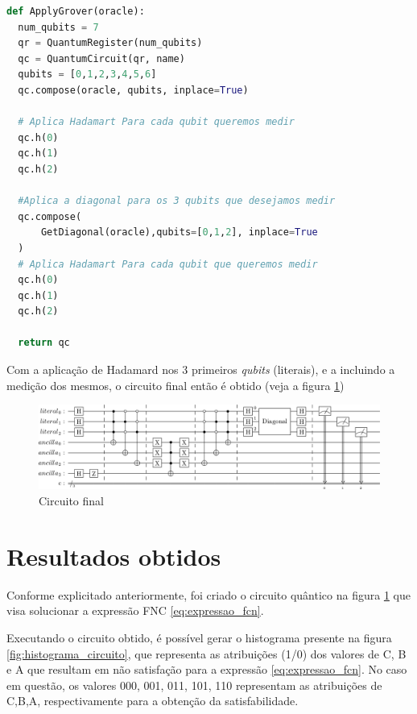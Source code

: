 \documentclass[12pt]{article}
\begin{document}
\begin{lstlisting}[language=Python, caption={Adição do operador de Grover ao \textit{oráculo}}, frame=single, label={lst:create_difusor}]
def ApplyGrover(oracle):
  num_qubits = 7
  qr = QuantumRegister(num_qubits)
  qc = QuantumCircuit(qr, name)
  qubits = [0,1,2,3,4,5,6]
  qc.compose(oracle, qubits, inplace=True)

  # Aplica Hadamart Para cada qubit queremos medir
  qc.h(0)
  qc.h(1)
  qc.h(2)

  #Aplica a diagonal para os 3 qubits que desejamos medir
  qc.compose(
      GetDiagonal(oracle),qubits=[0,1,2], inplace=True
  )
  # Aplica Hadamart Para cada qubit que queremos medir
  qc.h(0)
  qc.h(1)
  qc.h(2)

  return qc
\end{lstlisting}

Com a aplicação de Hadamard nos 3 primeiros \textit{qubits} (literais), e a incluindo a medição dos mesmos, o circuito final então é obtido (veja a figura \ref{fig:circuito_final})

\begin{figure}[ht]
    \centering
    \includegraphics[width=1\linewidth]{circuito_final.png}
    \caption{Circuito final}
    \label{fig:circuito_final}
\end{figure}

\section{Resultados obtidos}\label{sec:resultados}

Conforme explicitado anteriormente, foi criado o circuito quântico na figura \ref{fig:circuito_final} que visa solucionar a expressão FNC \ref{eq:expressao_fcn}.

Executando o circuito obtido, é possível gerar o histograma presente na figura \ref{fig:histograma_circuito}, que representa as atribuições (1/0) dos valores de C, B e A que resultam em não satisfação para a expressão \ref{eq:expressao_fcn}.
No caso em questão, os valores 000, 001, 011, 101, 110 representam as atribuições de C,B,A, respectivamente para a obtenção da satisfabilidade.
\end{document}
